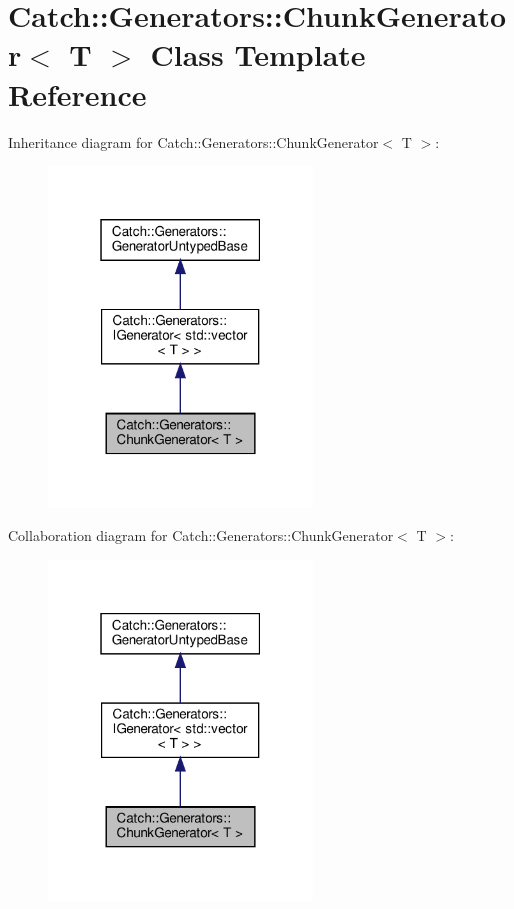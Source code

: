 \hypertarget{classCatch_1_1Generators_1_1ChunkGenerator}{}\section{Catch\+:\+:Generators\+:\+:Chunk\+Generator$<$ T $>$ Class Template Reference}
\label{classCatch_1_1Generators_1_1ChunkGenerator}


Inheritance diagram for Catch\+:\+:Generators\+:\+:Chunk\+Generator$<$ T $>$\+:
\nopagebreak
\begin{figure}[H]
\begin{center}
\leavevmode
\includegraphics[width=199pt]{classCatch_1_1Generators_1_1ChunkGenerator__inherit__graph}
\end{center}
\end{figure}


Collaboration diagram for Catch\+:\+:Generators\+:\+:Chunk\+Generator$<$ T $>$\+:
\nopagebreak
\begin{figure}[H]
\begin{center}
\leavevmode
\includegraphics[width=199pt]{classCatch_1_1Generators_1_1ChunkGenerator__coll__graph}
\end{center}
\end{figure}
